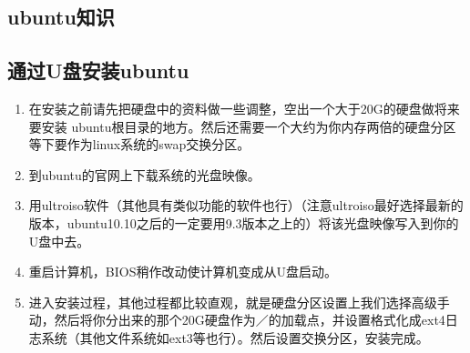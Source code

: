 \documentclass[11pt,oneside]{book}
\begin{document}
\setcounter{tocdepth}{2}    
\tableofcontents


\begin{common-format}
\mainmatter 

\chapter{ubuntu知识}
\section{通过U盘安装ubuntu}
\begin{enumerate}
\item  在安装之前请先把硬盘中的资料做一些调整，空出一个大于20G的硬盘做将来要安装 ubuntu根目录的地方。然后还需要一个大约为你内存两倍的硬盘分区等下要作为linux系统的swap交换分区。
\item 到ubuntu的官网上下载系统的光盘映像。
\item 用ultroiso软件（其他具有类似功能的软件也行）（注意ultroiso最好选择最新的版本，ubuntu10.10之后的一定要用9.3版本之上的）将该光盘映像写入到你的U盘中去。
\item 重启计算机，BIOS稍作改动使计算机变成从U盘启动。
\item 进入安装过程，其他过程都比较直观，就是硬盘分区设置上我们选择高级手动，然后将你分出来的那个20G硬盘作为／的加载点，并设置格式化成ext4日志系统（其他文件系统如ext3等也行）。然后设置交换分区，安装完成。
\end{enumerate}


\end{common-format}
\end{document}
